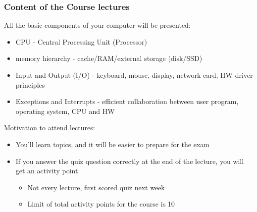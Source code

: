 \documentclass{beamer}
\begin{document}
\begin{frame}
\frametitle{Content of the Course lectures}
All the basic components of your computer will be presented:
\begin{itemize}
\item CPU - Central Processing Unit (Processor)
\item memory hierarchy - cache/RAM/external storage (disk/SSD)
\item Input and Output (I/O) - keyboard, mouse, display, network card, HW driver principles
\item Exceptions and Interrupts - efficient collaboration between user program, operating system, CPU and HW
\end{itemize}

Motivation to attend lectures:
\begin{itemize}
\item You'll learn topics, and it will be easier to prepare for the exam
\item If you answer the quiz question correctly at the end of the lecture, you will get an activity point
  \begin{itemize}
  \item Not every lecture, first scored quiz next week
  \item Limit of total activity points for the course is 10
  \end{itemize}
\end{itemize}

\end{frame}
\end{document}
